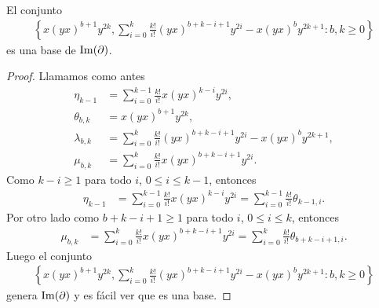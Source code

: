\documentclass[fleqn,../tesis.tex]{subfiles}
\begin{document}
\begin{prop}
\label{impartial}
El conjunto
\begin{align*}
		\left\{ x(yx)^{b + 1}y^{2k},
			\sum_{i = 0}^k\frac{k!}{i!}(yx)^{b + k - i + 1}y^{2i} - x(yx)^by^{2k + 1} :b, k \geq 0 \right\}
\end{align*}
es una base de $\operatorname{Im}(\partial)$.
\end{prop}
\begin{proof}
Llamamos como antes
\begin{align*}
	\eta_{k - 1} &=  \sum_{i = 0}^{k-1}\frac{k!}{i!}x(yx)^{k - i}y^{2i}, \\
	\theta_{b,k} &= x(yx)^{b + 1}y^{2k},\\
	\lambda_{b,k} &= \sum_{i = 0}^k\frac{k!}{i!}(yx)^{b + k - i + 1}y^{2i} - x(yx)^by^{2k + 1}, \\
	\mu_{b,k} &= \sum_{i = 0}^k\frac{k!}{i!}x(yx)^{b + k - i + 1}y^{2i}.
\end{align*}
Como $k - i \geq 1$ para todo $i$,  $0 \leq i \leq k -1$, entonces
\begin{align*}
	\eta_{k - 1} &= \sum_{i = 0}^{k-1}\frac{k!}{i!}x(yx)^{k - i}y^{2i} = \sum_{i = 0}^{k-1}\frac{k!}{i!}\theta_{k-1,i}.
\end{align*}
Por otro lado como $b + k - i + 1 \geq 1$ para todo $i$, $0 \leq i \leq k$, entonces
\begin{align*}
	\mu_{b,k} &= \sum_{i = 0}^k\frac{k!}{i!}x(yx)^{b + k - i + 1}y^{2i}
		= \sum_{i = 0}^k\frac{k!}{i!}\theta_{b + k - i + 1, i}.
\end{align*}
Luego el conjunto
\begin{align*}
	\left\{ x(yx)^{b + 1}y^{2k},
		\sum_{i = 0}^k\frac{k!}{i!}(yx)^{b + k - i + 1}y^{2i} - x(yx)^by^{2k + 1} :b,k \geq 0	\right\}
\end{align*}
 genera $\operatorname{Im}(\partial)$ y es fácil ver que es una base.
\end{proof}
\end{document}
